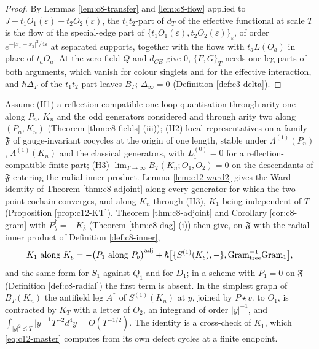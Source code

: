 \begin{proof}
By Lemmas \ref{lem:c8-transfer} and \ref{lem:c8-flow} applied to $J+t_1O_1(\varepsilon)+t_2O_2(\varepsilon)$, the $t_1t_2$-part of $d_T$ of the effective functional at scale $T$ is the flow of the special-edge part of $\{t_1O_1(\varepsilon),t_2O_2(\varepsilon)\}_\varepsilon$, of order $e^{-|x_1-x_2|^2/4\varepsilon}$ at separated supports, together with the flows with $t_aL(O_a)$ in place of $t_aO_a$. At the zero field $Q$ and $d_{CE}$ give $0$, $\{F,G\}_T$ needs one-leg parts of both arguments, which vanish for colour singlets and for the effective interaction, and $\hbar\Delta_T$ of the $t_1t_2$-part leaves $B_T$; $\Delta_\infty=0$ (Definition \ref{def:c3-delta}).
\end{proof}

\begin{remark}[$K=P^\dagger$ as a cross-check]
\label{rem:c12-KP}
Assume (H1) a reflection-compatible one-loop quantisation through arity one along $P_n$, $K_n$ and the odd generators considered and through arity two along $(P_n,K_n)$ (Theorem \ref{thm:c8-fields} (iii)); (H2) local representatives on a family $\mathfrak F$ of gauge-invariant cocycles at the origin of one length, stable under $\Lambda^{(1)}(P_n)$, $\Lambda^{(1)}(K_n)$ and the classical generators, with $L_1^{(0)}=0$ for a reflection-compatible finite part; (H3) $\lim_{T\to\infty}B_T(K_n;O_1,O_2)=0$ on the descendants of $\mathfrak F$ entering the radial inner product. Lemma \ref{lem:c12-ward2} gives the Ward identity of Theorem \ref{thm:c8-adjoint} along every generator for which the two-point cochain converges, and along $K_n$ through (H3), $K_1$ being independent of $T$ (Proposition \ref{prop:c12-KT}). Theorem \ref{thm:c8-adjoint} and Corollary \ref{cor:c8-gram} with $P_b^\dagger=-K_{\bar b}$ (Theorem \ref{thm:c8-dag} (i)) then give, on $\mathfrak F$ with the radial inner product of Definition \ref{def:c8-inner},
\[
K_1\ \text{along}\ K_{\bar b}=-\big(P_1\ \text{along}\ P_b\big)^{\rm adj}+\hbar\big[\{S^{(1)}(K_{\bar b}),-\},\mathrm{Gram}_{\rm tree}^{-1}\mathrm{Gram}_1\big],
\]
and the same form for $S_1$ against $Q_1$ and for $D_1$; in a scheme with $P_1=0$ on $\mathfrak F$ (Definition \ref{def:c8-radial}) the first term is absent. In the simplest graph of $B_T(K_n)$ the antifield leg $A^*$ of $S^{(1)}(K_n)$ at $y$, joined by $P\star v.$ to $O_1$, is contracted by $K_T$ with a letter of $O_2$, an integrand of order $|y|^{-1}$, and $\int_{|y|^2\lesssim T}|y|^{-1}T^{-2}d^4y=O(T^{-1/2})$. The identity is a cross-check of $K_1$, which \eqref{eq:c12-master} computes from its own defect cycles at a finite endpoint.
\end{remark}

